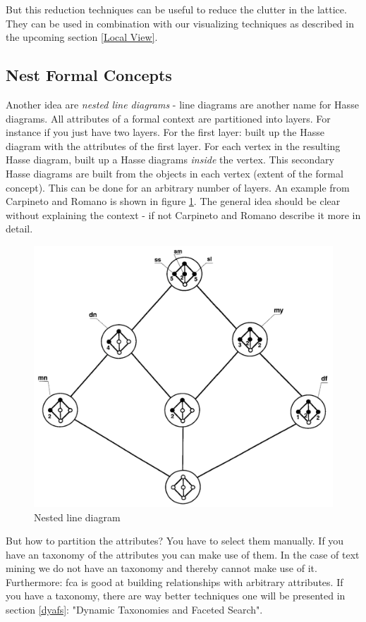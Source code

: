 \documentclass[11pt]{report}
\begin{document}
{{	But this reduction techniques can be useful to reduce the clutter in the lattice. They can be used in combination with our visualizing techniques as described in the upcoming section \ref{Local View}. \\
	
\subsection{Nest Formal Concepts}	

Another idea are \textit{nested line diagrams} - line diagrams are another name for Hasse diagrams. All attributes of a formal context are partitioned into layers. For instance if you just have two layers. For the first layer: built up the Hasse diagram with the attributes of the first layer. For each vertex in the resulting Hasse diagram, built up a Hasse diagrams \textit{inside} the vertex. This secondary Hasse diagrams are built from the objects in each vertex (extent of the formal concept). This can be done for an arbitrary number of layers. An example from Carpineto and Romano \cite{carpineto2004concept} is shown in figure \ref{figure:nested}. The general idea should be clear without explaining the context - if not Carpineto and Romano \cite{carpineto2004concept} describe it more in detail. \\

\begin{figure}[!ht]
	\centering
	\includegraphics[width=0.5\linewidth]{./images/nested}
\caption{Nested line diagram}
\label{figure:nested}
\end{figure}
	
But how to partition the attributes? You have to select them manually. If you have an taxonomy of the attributes you can make use of them. In the case of text mining we do not have an taxonomy and thereby cannot make use of it. Furthermore: \acrshort{fca} is good at building relationships with arbitrary attributes. If you have a taxonomy, there are way better techniques one will be presented in section \ref{dyafs}: "Dynamic Taxonomies and Faceted Search". \\

}}
\end{document}

